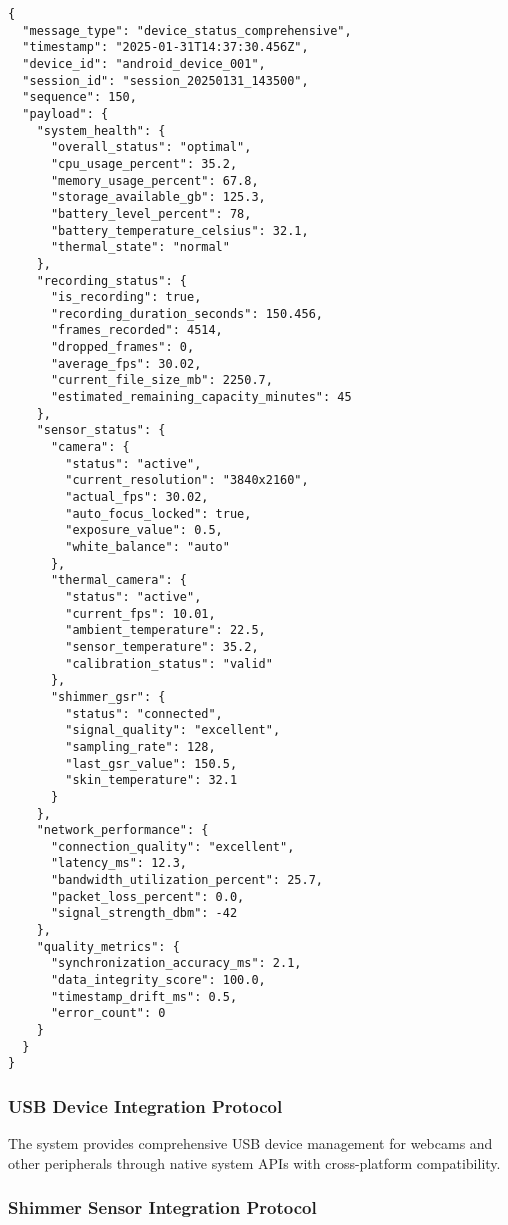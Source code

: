 \documentclass[11pt,a4paper]{article}
\begin{document}
\begin{verbatim}
{
  "message_type": "device_status_comprehensive",
  "timestamp": "2025-01-31T14:37:30.456Z",
  "device_id": "android_device_001",
  "session_id": "session_20250131_143500",
  "sequence": 150,
  "payload": {
    "system_health": {
      "overall_status": "optimal",
      "cpu_usage_percent": 35.2,
      "memory_usage_percent": 67.8,
      "storage_available_gb": 125.3,
      "battery_level_percent": 78,
      "battery_temperature_celsius": 32.1,
      "thermal_state": "normal"
    },
    "recording_status": {
      "is_recording": true,
      "recording_duration_seconds": 150.456,
      "frames_recorded": 4514,
      "dropped_frames": 0,
      "average_fps": 30.02,
      "current_file_size_mb": 2250.7,
      "estimated_remaining_capacity_minutes": 45
    },
    "sensor_status": {
      "camera": {
        "status": "active",
        "current_resolution": "3840x2160",
        "actual_fps": 30.02,
        "auto_focus_locked": true,
        "exposure_value": 0.5,
        "white_balance": "auto"
      },
      "thermal_camera": {
        "status": "active",
        "current_fps": 10.01,
        "ambient_temperature": 22.5,
        "sensor_temperature": 35.2,
        "calibration_status": "valid"
      },
      "shimmer_gsr": {
        "status": "connected",
        "signal_quality": "excellent",
        "sampling_rate": 128,
        "last_gsr_value": 150.5,
        "skin_temperature": 32.1
      }
    },
    "network_performance": {
      "connection_quality": "excellent",
      "latency_ms": 12.3,
      "bandwidth_utilization_percent": 25.7,
      "packet_loss_percent": 0.0,
      "signal_strength_dbm": -42
    },
    "quality_metrics": {
      "synchronization_accuracy_ms": 2.1,
      "data_integrity_score": 100.0,
      "timestamp_drift_ms": 0.5,
      "error_count": 0
    }
  }
}
\end{verbatim}

\subsubsection{USB Device Integration Protocol}

The system provides comprehensive USB device management for webcams and other peripherals through native system APIs
with cross-platform compatibility.

\subsubsection{Shimmer Sensor Integration Protocol}
\end{document}

